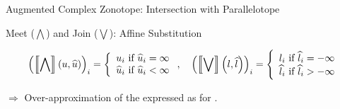 \begin{frame}{Augmented Complex Zonotope: Intersection with Parallelotope}
%
\end{frame}




\begin{frame}{Meet  ($\bigwedge$) and Join ($\bigvee$): Affine Substitution}

{\small
\begin{exampleblock}{}%
\vspace{-1em}
\begin{align*}
&\left(\left\llbracket\bigwedge\right\rrbracket\left(u,\widehat{u}\right)\right)_i=
\left\{
\begin{array}{l}
u_i~\text{if}~\widehat{u}_i=\infty\\
\widehat{u}_i~\text{if}~\widehat{u}_i<\infty
\end{array}
\right.,\hspace{1em}
\left(\left\llbracket\bigvee\right\rrbracket\left(l,\widehat{l}\right)\right)_i=
\left\{
\begin{array}{l}
l_i~\text{if}~\widehat{l}_i=-\infty\\
\widehat{l}_i~\text{if}~\widehat{l}_i>-\infty
\end{array}
\right.\\
\end{align*}
%
\end{exampleblock}
}
%
\begin{block}{}
%
\end{block}
%
\begin{alertblock}{}
$\Rightarrow$ {\small Over-approximation of the   expressed as  for .}
\end{alertblock}
\end{frame}

